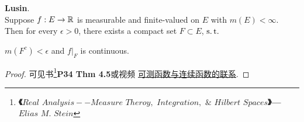 	\vspace{2em}
	
	\begin{thm}\label{thm 3.8.2}
		\textbf{Lusin}. \\
		Suppose $f : E \rightarrow \mathbb{R}$ is measurable and finite-valued on $E$ with $m(E) < \infty$. Then for every $\epsilon > 0$, there exists a compact set $F \subset E$, $\operatorname{s.t.}$
		\begin{center}
			$m(F^c) < \epsilon$ and $f|_{F}$ is continuous.
		\end{center}
	
		\vspace{4em}
		\begin{proof}
			可见书\footnote{\textbf{《$Real \,\, Analysis -- Measure \,\, Theroy, \,\, Integration, \,\, \& \,\, Hilbert \,\, Spaces$》--- $Elias \,\, M. \,\, Stein$}}\textbf{P34 Thm 4.5}或视频 \href{https://www.bilibili.com/video/BV1FT411C7wM/?p=30}{可测函数与连续函数的联系}.
		\end{proof}
	\end{thm}

	\ifx\allfiles\undefined

\fi